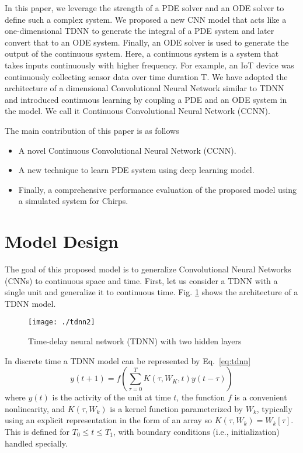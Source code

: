 \documentclass{article}
\begin{document}
In this paper, we leverage the strength of a PDE solver and an ODE solver to define such a complex system. We proposed a new CNN model that acts like a one-dimensional TDNN to generate the integral of a PDE system and later convert that to an ODE system. Finally, an ODE solver is used to generate the output of the continuous system.  Here, a continuous system is a system that takes inputs continuously with higher frequency. For example, an IoT device was continuously collecting sensor data over time duration T. We have adopted the architecture of a dimensional Convolutional Neural Network similar to TDNN and introduced continuous learning by coupling a PDE and an ODE system in the model. We call it Continuous Convolutional Neural Network (CCNN).

The main contribution of this paper is as follows

\begin{itemize}
    \item A novel Continuous Convolutional Neural Network (CCNN).
    \item A new technique to learn PDE system using deep learning model.
    \item Finally, a comprehensive performance evaluation of the proposed model using a simulated system for Chirps. 
\end{itemize}

\section{Model Design}
The goal of this proposed model is to generalize Convolutional Neural Networks (CNNs) \cite{lecun1989backpropagation} to continuous space and time.  First, let us consider a TDNN with a single unit and generalize it to continuous time. Fig. \ref{fig:tdnn} shows the architecture of a TDNN model. 

\begin{figure}[htb]
    \centering
    \texttt{[image: ./tdnn2]}
    \caption{Time-delay neural network (TDNN) with two hidden layers}
    \label{fig:tdnn}
\end{figure}

In discrete time a TDNN model can be represented by Eq.~\eqref{eq:tdnn}
\begin{equation}
  y(t+1) = f( \sum_{\tau = 0}^T K(\tau, W_K, t) y(t-\tau) )
  \label{eq:tdnn}
\end{equation}
where $y(t)$ is the activity of the unit at time $t$, the function $f$ is a convenient nonlinearity, and $K(\tau, W_k)$ is a kernel function parameterized by $W_k$, typically using an explicit representation in the form of an array so $K(\tau, W_k) = W_k[\tau]$.  This is defined for $T_0 \leq t \leq T_1$, with boundary conditions (i.e., initialization) handled specially.
\end{document}
